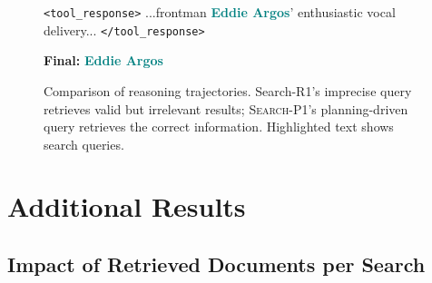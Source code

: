 \documentclass[11pt]{article}
\newcommand{\method}{\textsc{Search-P1}\xspace}
\begin{document}
\begin{figure}[t]
\begin{tcolorbox}
\begin{minipage}[t]{0.48\textwidth}
\begin{tcolorbox}[colback=green!3, colframe=green!40, title=\textbf{\method (Correct)}, fonttitle=\bfseries, boxrule=0.5pt, left=2mm, right=2mm, top=1mm, bottom=1mm]
\texttt{<tool\_response>} ...frontman \textcolor{teal}{\textbf{Eddie Argos}}' enthusiastic vocal delivery... \texttt{</tool\_response>}

\textbf{Final:} \textcolor{green!50!black}{} \textcolor{teal}{\textbf{Eddie Argos}}
\end{tcolorbox}
\end{minipage}

\end{tcolorbox}
\caption{Comparison of reasoning trajectories. Search-R1's imprecise query retrieves valid but irrelevant results; \method's planning-driven query retrieves the correct information. \colorbox{yellow!30}{Highlighted} text shows search queries.}
\label{fig:case_comparison}
\end{figure}

\section{Additional Results}
\label{sec:appendix_results}

\subsection{Impact of Retrieved Documents per Search}
\label{sec:appendix_num_docs}
\end{document}
